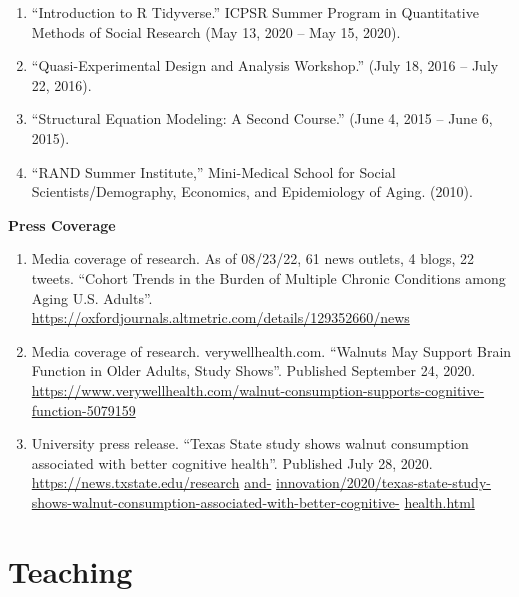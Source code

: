 \documentclass[
]{article}
\begin{document}
\begin{enumerate}
\def\labelenumi{\arabic{enumi}.}
\item
  ``Introduction to R Tidyverse.'' ICPSR Summer Program in Quantitative
  Methods of Social Research (May 13, 2020 -- May 15, 2020).
\item
  ``Quasi-Experimental Design and Analysis Workshop.'' (July 18, 2016 --
  July 22, 2016).
\item
  ``Structural Equation Modeling: A Second Course.'' (June 4, 2015 --
  June 6, 2015).
\item
  ``RAND Summer Institute,'' Mini-Medical School for Social
  Scientists/Demography, Economics, and Epidemiology of Aging. (2010).
\end{enumerate}

\textbf{Press Coverage}

\begin{enumerate}
\def\labelenumi{\arabic{enumi}.}
\item
  Media coverage of research. As of 08/23/22, 61 news outlets, 4 blogs,
  22 tweets. ``Cohort Trends in the Burden of Multiple Chronic
  Conditions among Aging U.S. Adults''.
  \url{https://oxfordjournals.altmetric.com/details/129352660/news}
\item
  Media coverage of research. verywellhealth.com. ``Walnuts May Support
  Brain Function in Older Adults, Study Shows''. Published September 24,
  2020.
  \url{https://www.verywellhealth.com/walnut-consumption-supports-cognitive-function-5079159}
\item
  University press release. ``Texas State study shows walnut consumption
  associated with better cognitive health''. Published July 28, 2020.
  \href{https://news.txstate.edu/research-and-innovation/2020/texas-state-study-shows-walnut-consumption-associated-with-better-cognitive-health.html}{https://news.txstate.edu/research}
  \href{https://news.txstate.edu/research-and-innovation/2020/texas-state-study-shows-walnut-consumption-associated-with-better-cognitive-health.html}{and-}
  \href{https://news.txstate.edu/research-and-innovation/2020/texas-state-study-shows-walnut-consumption-associated-with-better-cognitive-health.html}{innovation/2020/texas-state-study-shows-walnut-consumption-associated-with-better-cognitive-}
  \href{https://news.txstate.edu/research-and-innovation/2020/texas-state-study-shows-walnut-consumption-associated-with-better-cognitive-health.html}{health.html}
\end{enumerate}

\hypertarget{teaching}{%
\section{\texorpdfstring{\textbf{Teaching}}{Teaching}}\label{teaching}}
\end{document}
